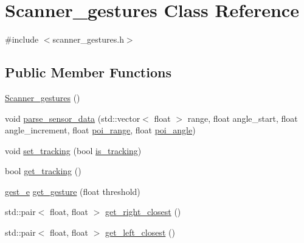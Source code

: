 \hypertarget{class_scanner__gestures}{}\section{Scanner\+\_\+gestures Class Reference}
\label{class_scanner__gestures}


{\ttfamily \#include $<$scanner\+\_\+gestures.\+h$>$}

\subsection*{Public Member Functions}
\begin{DoxyCompactItemize}
\item 
\hyperlink{class_scanner__gestures_a7bb0ce7e1b2d40a3f5b2b55f8a8508e2}{Scanner\+\_\+gestures} ()
\item 
void \hyperlink{class_scanner__gestures_a6dc7d1dc6802ea02d94f730b32a81e87}{parse\+\_\+sensor\+\_\+data} (std\+::vector$<$ float $>$ range, float angle\+\_\+start, float angle\+\_\+increment, float \hyperlink{class_scanner__gestures_a55694caa26cbfbc83f349a11a15a6980}{poi\+\_\+range}, float \hyperlink{class_scanner__gestures_a191a5090d123ef3ab2f3ae7e7c83c59b}{poi\+\_\+angle})
\item 
void \hyperlink{class_scanner__gestures_a8b8caf958afa2915e37a521c634ce694}{set\+\_\+tracking} (bool \hyperlink{class_scanner__gestures_a31783191e1afd1ab1e9c295aa243b6ac}{is\+\_\+tracking})
\item 
bool \hyperlink{class_scanner__gestures_a17ea1a511a53a07fb1f407f5229e0363}{get\+\_\+tracking} ()
\item 
\hyperlink{scanner__gestures_8h_a7439cb1fb2597b68ef2f1f3306500dec}{gest\+\_\+e} \hyperlink{class_scanner__gestures_a8c02a5520f94f676b2e3f510ed6765bb}{get\+\_\+gesture} (float threshold)
\item 
std\+::pair$<$ float, float $>$ \hyperlink{class_scanner__gestures_a07e953de14a41b97f5d66b8431760c37}{get\+\_\+right\+\_\+closest} ()
\item 
std\+::pair$<$ float, float $>$ \hyperlink{class_scanner__gestures_ad657d904d60e85f53dd7f9dc11ccf41e}{get\+\_\+left\+\_\+closest} ()
\end{DoxyCompactItemize}
